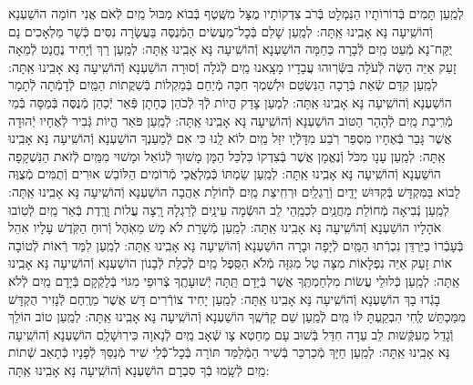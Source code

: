 \documentclass[twoside, openany, parskip=half, 11pt]{book}
\begin{document}
\begin{small}
	לְמַֽעַן תָּמִים בְּֿדוֹרוֹתָיו הַנִּמְלָט בְּֿרֹב צִדְקוֹתָיו
	מֻצָּל מִשֶּֽׁטֶף בְּֿבוֹא מַבּוּל מַֽיִם לְֿאֹם אֲנִי חוֹמָה הוֹשַׁעְנָא וְֿהוֹשִֽׁיעָה נָּא אָבִֽינוּ אַֽתָּה:
	לְמַֽעַן שָׁלֵם בְּֿכׇל־מַעֲשִׂים הַמְֿנֻסֶּה בַּעֲשָׂרָה נִסִּים
	כְּֿשָׁר מַלְאָכִים נָם יֻקַּח־נָא מְֿעַט מַֽיִם לְֿבָרָה כַּחַמָּה הוֹשַׁעְנָא וְֿהוֹשִֽׁיעָה נָּא אָבִֽינוּ אַֽתָּה:
	לְמַֽעַן רַךְ וְֿיָחִיד נֶחֱנַט לְֿמֵאָה זָעַק אַיֵּה הַשֶּׂה לְֿעֹלָה
	בִּשְּֿׂרֽוּהוּ עֲבָדָיו מָצָֽאנוּ מַֽיִם לְֿגֹלָה וְֿסוּרָה הוֹשַׁעְנָא וְֿהוֹשִֽׁיעָה נָּא אָבִֽינוּ אַֽתָּה:
	לְמַֽעַן קִדַּם שְֿׂאֵת בְּֿרָכָה הַנִּשְׂטַם וּלְשִׁמְךָ חִכָּה
	מְֿיַחֵם בְּֿמַקְלוֹת בְּֿשִׁקֲתוֹת הַמַּֽיִם לְֿדָמְֿתָה לְֿתָמָר הוֹשַׁעְנָא וְֿהוֹשִֽׁיעָה נָּא אָבִֽינוּ אַֽתָּה:
	לְמַעַן צָדַק הֱיוֹת לְֿךָ לְֿכֹהֵן כֶּחָתָן פְּֿאֵר יְֿכַהֵן
	מְֿנֻסֶּה בְּֿמַסָּה בְּֿמֵי מְֿרִֽיבַת מַֽיִם לְֿהָהָר הַטּוֹב הוֹשַׁעְנָא וְֿהוֹשִֽׁיעָה נָּא אָבִֽינוּ אַֽתָּה:
	לְֿמַֽעַן פֹּאַר הֱיוֹת גְּֿבִיר לְֿאֶחָיו יְֿהוּדָה אֲשֶׁר גָּבַר בְּֿאֶחָיו
	מִסְפַּר רֹֽבַע מִדָּלְֿיָו יִזַּל מַֽיִם לוֹא לָֽנוּ כִּי אִם לְֿמַעַנְךָ הוֹשַׁעְנָא וְֿהוֹשִֽׁיעָה נָּא אָבִֽינוּ אַֽתָּה:
	לְמַֽעַן עָנָו מִכֹּל וְֿנֶאֱמָן אֲשֶׁר בְּֿצִדְקוֹ כִּלְכֵּל הַמָּן
	מָשׁוּךְ לְֿגוֹאֵל וּמָשׁוּי מִמַּֽיִם לְֿזֹאת הַנִּשְׁקָפָה הוֹשַׁעְנָא וְֿהוֹשִֽׁיעָה נָּא אָבִֽינוּ אַֽתָּה:
	לְמַֽעַן שַׂמְתּוֹ כְּֿמַלְאֲכֵי מְֿרוֹמִים הַלּוֹבֵשׁ אוּרִים וְֿתֻמִּים
	מְֿצֻוֶּה לָבוֹא בַּמִּקְדָּשׁ בְּֿקִדּוּשׁ יָדַֽיִם וְֿרַגְלַֽיִם וּרְחִֽיצַת מַֽיִם
	לְֿחוֹלַת אַהֲבָה הוֹשַׁעְנָא וְֿהוֹשִֽׁיעָה נָּא אָבִֽינוּ אַֽתָּה:
	לְמַֽעַן נְֿבִיאָה מְֿחוֹלַת מַחֲנַֽיִם לִכְמֵֽהֵי לֵב הוּשְֿׂמָה עֵינַֽיִם
	לְֿרַגְלָהּ רָֽצָה עֲלוֹת וָרֶֽדֶת בְּֿאֵר מַֽיִם לְֿטֽוֹבוּ אֹהָלָיו הוֹשַׁעְנָא וְֿהוֹשִֽׁיעָה נָּא אָבִֽינוּ אַֽתָּה:
	לְמַֽעַן מְֿשָׁרֵת לֹא מָשׁ מֵאֹֽהֶל וְֿרוּחַ הַקֹּֽדֶשׁ עָלָיו אִהֵל
	בְּֿעָבְֿרוֹ בַיַּרְדֵּן נִכְרְֿתוּ הַמַּֽיִם לְֿיָפָה וּבָרָה הוֹשַׁעְנָא וְֿהוֹשִֽׁיעָה נָּא אָבִֽינוּ אַֽתָּה:
	לְמַֽעַן לִמַּד רְֿאוֹת לְֿטוֹבָה אוֹת זָעַק אַיֵּה נִפְלָאוֹת
	מִצָּה טַל מִגִּזָּה מְֿלֹא הַסֵּֽפֶל מַֽיִם לְֿכַלַּת לְֿבָנוֹן הוֹשַׁעְנָא וְֿהוֹשִֽׁיעָה נָּא אָבִֽינוּ אַֽתָּה:
	לְמַֽעַן כְּֿלוּלֵי עֲשׂוֹת מִלְחַמְתֶּֽךָ אֲשֶׁר בְּֿיָדָם תַּֽתָּה יְֿשׁוּעָתֶֽךָ
	צְֿרוּפֵי מִגּוֹי בְּֿלָקְֿקָם בְּֿיָדָם מַֽיִם לְֿלֹא בָגְֿדוּ בָךְ הוֹשַׁעְנָא וְֿהוֹשִֽׁיעָה נָּא אָבִֽינוּ אַֽתָּה:
	לְמַֽעַן יָחִיד צוֹרְֿרִים דָּשׁ אֲשֶׁר מֵרֶֽחֶם לְֿנָזִיר הֻקְדָּשׁ
	מִמַּכְתֵּשׁ לֶֽחִי הִבְקַֽעְתָּ לּוֹ מַֽיִם לְֿמַֽעַן שֵׁם קָדְֿשֶֽׁךָ הוֹשַׁעְנָא וְֿהוֹשִֽׁיעָה נָּא אָבִֽינוּ אַֽתָּה:
	לְמַֽעַן טוֹב הוֹלֵךְ וְֿגָדֵל מֵעִקְּֿשׁוּת לֵב עֵדָה חִדֵּל
	בְּֿשׁוּב עָם מֵחֵטְא צָו שְֿׁאָב מַֽיִם לְֿנָאוָה כִּירֽוּשָׁלָֽםִ הוֹשַׁעְנָא וְֿהוֹשִֽׁיעָה נָּא אָבִֽינוּ אַֽתָּה:
	לְמַֽעַן חַיָּךְ מְֿכַרְכֵּר בְּֿשִׁיר הַמְֿלַמֵּד תּוֹרָה בְּֿכׇל־כְּֿֿלֵי שִׁיר
	מְֿנַסֵּךְ לְֿפָנָיו כְּֿתָאַב שְֿׁתוֹת מַֽיִם לְֿשָֽׂמוּ בְֿךָ סִבְרָם הוֹשַׁעְנָא וְֿהוֹשִֽׁיעָה נָּא אָבִֽינוּ אַֽתָּה:

\end{small}
\end{document}
